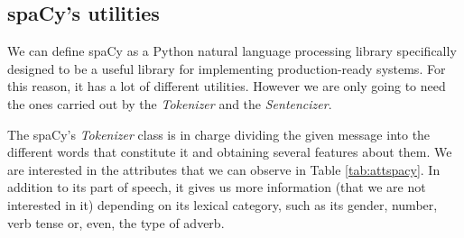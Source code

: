 \subsection{spaCy's utilities}\label{ssect:spacyut}
We can define spaCy as a Python natural language processing library specifically designed to be a useful library for implementing production-ready systems. For this reason, it has a lot of different utilities. However we are only going to need the ones carried out by the \textit{Tokenizer} and the \textit{Sentencizer}.

The spaCy's \textit{Tokenizer} class is in charge dividing the given message into the different words that constitute it and obtaining several features about them. We are interested in the attributes that we can observe in Table \ref{tab:attspacy}. In addition to its part of speech, it gives us more information (that we are not interested in it) depending on its lexical category, such as its gender, number, verb tense or, even, the type of adverb.


